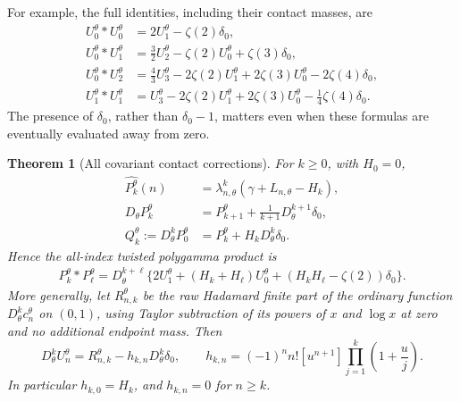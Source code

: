 \documentclass[11pt,letterpaper]{article}
\numberwithin{equation}{section}
\theoremstyle{plain}
\newtheorem{theorem}{Theorem}[section]
\theoremstyle{definition}
\theoremstyle{remark}
\begin{document}
For example, the full identities, including their contact masses, are
\begin{align}
 U_0^\theta*U_0^\theta
   &=2U_1^\theta-\zeta(2)\delta_0,\label{tw:eq:00}\\
 U_0^\theta*U_1^\theta
   &=\tfrac32U_2^\theta-\zeta(2)U_0^\theta
                                      +\zeta(3)\delta_0,\label{tw:eq:01}\\
 U_0^\theta*U_2^\theta
   &=\tfrac43U_3^\theta-2\zeta(2)U_1^\theta
           +2\zeta(3)U_0^\theta-2\zeta(4)\delta_0,\label{tw:eq:02}\\
 U_1^\theta*U_1^\theta
   &=U_3^\theta-2\zeta(2)U_1^\theta
           +2\zeta(3)U_0^\theta-\tfrac14\zeta(4)\delta_0.
 \label{tw:eq:11}
\end{align}
The presence of $\delta_0$, rather than $\delta_0-1$, matters even
when these formulas are eventually evaluated away from zero.

\begin{theorem}[All covariant contact corrections]
\label{tw:thm:contacts}
For $k\ge0$, with $H_0=0$,
\begin{align}
 \widehat{P_k^\theta}(n)
   &=\lambda_{n,\theta}^k
                 (\gamma+L_{n,\theta}-H_k),\label{tw:eq:PFourier}\\
 D_\theta P_k^\theta
   &=P_{k+1}^\theta+\frac{1}{k+1}D_\theta^{k+1}\delta_0,
 \label{tw:eq:DP}\\
 Q_k^\theta:=D_\theta^kP_0^\theta
   &=P_k^\theta+H_kD_\theta^k\delta_0.
 \label{tw:eq:Q}
\end{align}
Hence the all-index twisted polygamma product is
\begin{align}
 P_k^\theta*P_\ell^\theta
  =D_\theta^{k+\ell}\bigl\{
      2U_1^\theta+(H_k+H_\ell)U_0^\theta
                 +(H_kH_\ell-\zeta(2))\delta_0\bigr\}.
 \label{tw:eq:polygammaproduct}
\end{align}
More generally, let $R_{n,k}^\theta$ be the raw Hadamard finite part
of the ordinary function $D_\theta^kc_n^\theta$ on $(0,1)$, using
Taylor subtraction of its powers of $x$ and $\log x$ at zero and no
additional endpoint mass. Then
\begin{equation}\label{tw:eq:allcontacts}
 D_\theta^kU_n^\theta
 =R_{n,k}^\theta-h_{k,n}D_\theta^k\delta_0,
 \qquad
 h_{k,n}=(-1)^n n![u^{n+1}]
                         \prod_{j=1}^k\left(1+\frac{u}{j}\right).
\end{equation}
In particular $h_{k,0}=H_k$, and $h_{k,n}=0$ for $n\ge k$.
\end{theorem}
\end{document}
